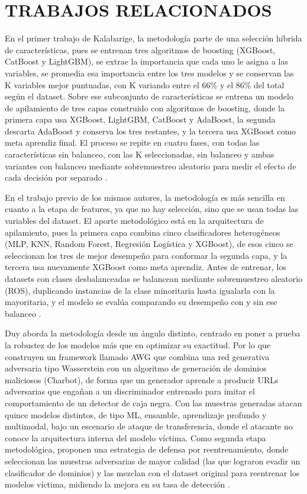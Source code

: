 \section{TRABAJOS RELACIONADOS}

En el primer trabajo de Kalabarige, la metodología parte de una selección híbrida de características, pues se entrenan tres algoritmos de boosting (XGBoost, CatBoost y LightGBM), se extrae la importancia que cada uno le asigna a las variables, se promedia esa importancia entre los tres modelos y se conservan las K variables mejor puntuadas, con K variando entre el 66\% y el 86\% del total según el dataset. Sobre ese subconjunto de características se entrena un modelo de apilamiento de tres capas construido con algoritmos de boosting, donde la primera capa usa XGBoost, LightGBM, CatBoost y AdaBoost, la segunda descarta AdaBoost y conserva los tres restantes, y la tercera usa XGBoost como meta aprendiz final. El proceso se repite en cuatro fases, con todas las características sin balanceo, con las K seleccionadas, sin balanceo y ambas variantes con balanceo mediante sobremuestreo aleatorio para medir el efecto de cada decisión por separado \cite{kalabarige2023boosting}. \newline

En el trabajo previo de los mismos autores, la metodología es más sencilla en cuanto a la etapa de features, ya que no hay selección, sino que se usan todas las variables del dataset. El aporte metodológico está en la arquitectura de apilamiento, pues la primera capa combina cinco clasificadores heterogéneos (MLP, KNN, Random Forest, Regresión Logística y XGBoost), de esos cinco se seleccionan los tres de mejor desempeño para conformar la segunda capa, y la tercera usa nuevamente XGBoost como meta aprendiz. Antes de entrenar, los datasets con clases desbalanceadas se balancean mediante sobremuestreo aleatorio (ROS), duplicando instancias de la clase minoritaria hasta igualarla con la mayoritaria, y el modelo se evalúa comparando su desempeño con y sin ese balanceo \cite{kalabarige2022multilayer}. \newline

Duy aborda la metodología desde un ángulo distinto, centrado en poner a prueba la robustez de los modelos más que en optimizar su exactitud. Por lo que construyen un framework llamado AWG que combina una red generativa adversaria tipo Wasserstein con un algoritmo de generación de dominios maliciosos (Charbot), de forma que un generador aprende a producir URLs adversarias que engañan a un discriminador entrenado para imitar el comportamiento de un detector de caja negra. Con las muestras generadas atacan quince modelos distintos, de tipo ML, ensamble, aprendizaje profundo y multimodal, bajo un escenario de ataque de transferencia, donde el atacante no conoce la arquitectura interna del modelo víctima. Como segunda etapa metodológica, proponen una estrategia de defensa por reentrenamiento, donde seleccionan las muestras adversarias de mayor calidad (las que lograron evadir un clasificador de dominios) y las mezclan con el dataset original para reentrenar los modelos víctima, midiendo la mejora en su tasa de detección \cite{duy2024study}. \newline

